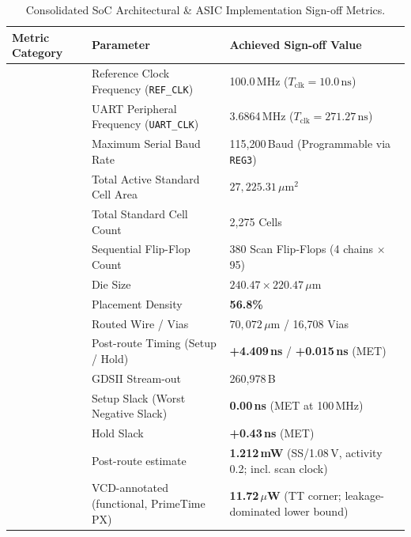 \documentclass[11pt,a4paper]{article}
\begin{document}
\begin{table}[htbp]
\centering
\caption{Consolidated SoC Architectural \& ASIC Implementation Sign-off Metrics.}
\label{tab:summary_results}
\small
\renewcommand{\arraystretch}{1.2}
\begin{tabularx}{\textwidth}{|>{\raggedright\arraybackslash}p{3.9cm}|>{\raggedright\arraybackslash}p{5.6cm}|Y|}
\hline
\textbf{Metric Category} & \textbf{Parameter} & \textbf{Achieved Sign-off Value} \\
\hline
{}
 & Reference Clock Frequency (\texttt{REF\_CLK}) & 100.0\,MHz ($T_{\text{clk}} = 10.0\,\text{ns}$) \\ 
 & UART Peripheral Frequency (\texttt{UART\_CLK}) & 3.6864\,MHz ($T_{\text{clk}} = 271.27\,\text{ns}$) \\ 
 & Maximum Serial Baud Rate & 115,200\,Baud (Programmable via \texttt{REG3}) \\
\hline
{}
 & Total Active Standard Cell Area & $27,225.31\,\mu\text{m}^2$ \\ 
 & Total Standard Cell Count & 2,275 Cells \\ 
 & Sequential Flip-Flop Count & 380 Scan Flip-Flops (4 chains $\times$ 95) \\
\hline
{}
 & Die Size & $240.47 \times 220.47\,\mu\text{m}$ \\ 
 & Placement Density & \textbf{56.8\%} \\ 
 & Routed Wire / Vias & $70,072\,\mu\text{m}$ / 16,708 Vias \\ 
 & Post-route Timing (Setup / Hold) & \textbf{+4.409\,ns} / \textbf{+0.015\,ns} (MET) \\ 
 & GDSII Stream-out & 260,978\,B \\
\hline
{}
 & Setup Slack (Worst Negative Slack) & \textbf{0.00\,ns} (MET at 100\,MHz) \\ 
 & Hold Slack & \textbf{+0.43\,ns} (MET) \\
\hline
{}
 & Post-route estimate & \textbf{1.212\,mW} (SS/1.08\,V, activity 0.2; incl. scan clock) \\ 
 & VCD-annotated (functional, PrimeTime PX) & \textbf{11.72\,$\mu$W} (TT corner; leakage-dominated lower bound) \\

\end{tabularx}
\end{table}
\end{document}
